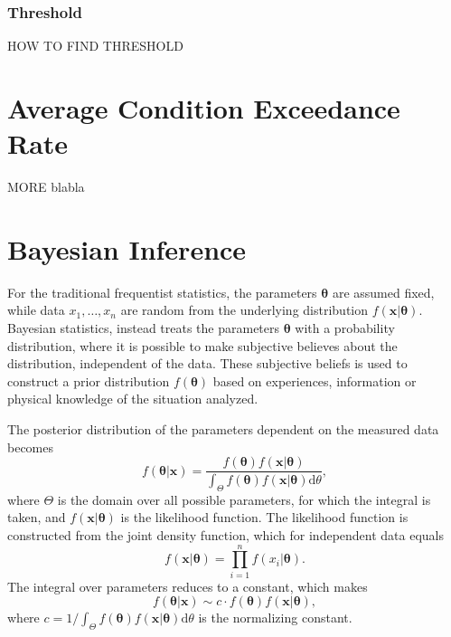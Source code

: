\subsubsection{Threshold}
HOW TO FIND THRESHOLD

\section{Average Condition Exceedance Rate}
MORE blabla

\section{Bayesian Inference}
\label{ch:BayesianInference}
For the traditional frequentist statistics, the parameters $\boldsymbol{\theta}$ are assumed fixed, while data $x_1,\dotsc ,x_n$ are random from the underlying distribution $f(\boldsymbol{x}| \boldsymbol{\theta})$. Bayesian statistics, instead treats the parameters $\boldsymbol{\theta}$ with a probability distribution, where it is possible to make subjective believes about the distribution, independent of the data. These subjective beliefs is used to construct a prior distribution $f(\boldsymbol{\theta})$ based on experiences, information or physical knowledge of the situation analyzed. 

The posterior distribution of the parameters dependent on the measured data becomes 
\begin{equation}
f(\boldsymbol{\theta}|\boldsymbol{x})=\frac{f(\boldsymbol{\theta})f(\boldsymbol{x}|\boldsymbol{\theta})}{\int_{\Theta} f(\boldsymbol{\theta})f(\boldsymbol{x}|\boldsymbol{\theta}) \mathrm{d} \theta}, 
\end{equation}
where $\Theta$ is the domain over all possible parameters, for which the integral is taken, and  $f(\boldsymbol{x}|\boldsymbol{\theta})$ is the likelihood function. The likelihood function is constructed from the joint density function, which for independent data equals
\begin{equation}
\label{eq:jointdens}
f(\boldsymbol{x}|\boldsymbol{\theta})=\prod_{i=1}^{n} f(x_i|\boldsymbol{\theta}).
\end{equation}
The integral over parameters reduces to a constant, which makes
\begin{equation}
f(\boldsymbol{\theta}|\boldsymbol{x}) \sim c \cdot f(\boldsymbol{\theta})f(\boldsymbol{x}|\boldsymbol{\theta}), \label{eq:genposteriorc}
\end{equation}
where $c=1/ \int_{\Theta} f(\boldsymbol{\theta})f(\boldsymbol{x}|\boldsymbol{\theta}) \mathrm{d} \theta$ is the normalizing constant.

